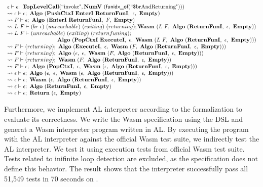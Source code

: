 \[
\begin{array}{l}
  \epsilon \vdash \epsilon; ~ \textbf{TopLevelCall}(\text{``invoke"}, \textbf{NumV} ~ (\textsf{funidx\_of}(\text{``\$brAndReturning"})))
  \\
  \leadsto \epsilon \vdash \epsilon; ~ \textbf{Algo} ~ (\textbf{PushCtxI} ~ \textbf{EnterI} ~ \textbf{ReturnFunI}, ~ \epsilon, ~ \textbf{Empty})
  \\
  \leadsto F \vdash \epsilon; ~ \textbf{Algo} ~ (\textbf{EnterI} ~ \textbf{ReturnFunI}, ~ F, ~ \textbf{Empty})
  \\
  \leadsto L ~ F \vdash (br ~ \epsilon) ~ (unreachable) ~ (exiting) ~ (returning); \textbf{Wasm} ~ (L ~ F, ~ \textbf{Algo} ~ (\textbf{ReturnFunI}, ~ \epsilon, ~ \textbf{Empty}))
  \\
  \leadsto L ~ F \vdash (unreachable) ~ (exiting) ~ (returnfuning); \\
  \quad\qquad\qquad\qquad\qquad \textbf{Algo} ~ (\textbf{PopCtxI} ~ \textbf{ExecuteI}, ~ \epsilon, ~ \textbf{Wasm} ~ (L ~ F, ~ \textbf{Algo} ~ (\textbf{ReturnFunI}, ~ \epsilon, ~ \textbf{Empty})))
  \\
  \leadsto F \vdash (returning); ~
    \textbf{Algo} ~ (\textbf{ExecuteI}, ~ \epsilon, ~ \textbf{Wasm} ~ (F, ~ \textbf{Algo} ~ (\textbf{ReturnFunI}, ~ \epsilon, ~ \textbf{Empty})))
  \\
  \leadsto F \vdash (returning); ~
    \textbf{Algo} ~ (\epsilon, ~ \epsilon, ~ \textbf{Wasm} ~ (F, ~ \textbf{Algo} ~ (\textbf{ReturnFunI}, ~ \epsilon, ~ \textbf{Empty})))
  \\
  \leadsto F \vdash (returning); ~ \textbf{Wasm} ~ (F, ~ \textbf{Algo} ~ (\textbf{ReturnFunI}, ~ \epsilon, ~ \textbf{Empty}))
  \\
  \leadsto F \vdash \epsilon; ~
    \textbf{Algo} ~ (\textbf{PopCtxI}, ~ \epsilon, ~ \textbf{Wasm} ~ (\epsilon, ~ \textbf{Algo} ~ (\textbf{ReturnFunI}, ~ \epsilon, ~ \textbf{Empty})))
  \\
  \leadsto \epsilon \vdash \epsilon; ~
    \textbf{Algo} ~ (\epsilon, ~ \epsilon, ~ \textbf{Wasm} ~ (\epsilon, ~ \textbf{Algo} ~ (\textbf{ReturnFunI}, ~ \epsilon, ~ \textbf{Empty})))
  \\
  \leadsto \epsilon \vdash \epsilon; ~ \textbf{Wasm} ~ (\epsilon, ~ \textbf{Algo} ~ (\textbf{ReturnFunI}, ~ \epsilon, ~ \textbf{Empty}))
  \\
  \leadsto \epsilon \vdash \epsilon; ~ \textbf{Algo} ~ (\textbf{ReturnFunI}, ~ \epsilon, ~ \textbf{Empty})
  \\
  \leadsto \epsilon \vdash \epsilon; ~ \textbf{Return} ~ (\epsilon, ~ \textbf{Empty})
  \\
\end{array}
\]

Furthermore, we implement AL interpreter according to the formalization to
evaluate its correctness.
We write the Wasm specification using the DSL and generat a Wasm interpreter
program written in AL.
By executing the program with the AL interpreter against the official Wasm test
suite, we indirectly test the AL interpreter.
We test it using execution tests from official Wasm test suite.
Tests related to inifinite loop detection are excluded, as the specification
does not define this behavior.
The result shows that the interpreter successfully pass all 51,549 tests in 70
seconds on .


